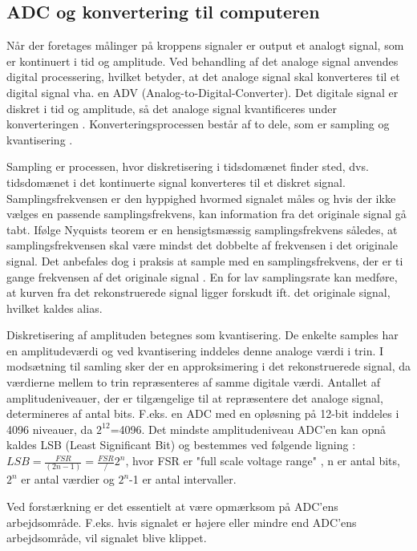 \subsection{ADC og konvertering til computeren}
Når der foretages målinger på kroppens signaler er output et analogt signal, som er kontinuert i tid og amplitude. Ved behandling af det analoge signal anvendes digital processering, hvilket betyder, at det analoge signal skal konverteres til et digital signal vha. en ADV (Analog-to-Digital-Converter). Det digitale signal er diskret i tid og amplitude, så det analoge signal kvantificeres under konverteringen \cite{Webster2009}. Konverteringsprocessen består af to dele, som er sampling og kvantisering \cite{Zouridakis2003}.  

Sampling er processen, hvor diskretisering i tidsdomænet finder sted, dvs. tidsdomænet i det kontinuerte signal konverteres til et diskret signal. Samplingsfrekvensen er den hyppighed hvormed signalet måles og hvis der ikke vælges en passende samplingsfrekvens, kan information fra det originale signal gå tabt. Ifølge Nyquists teorem er en hensigtsmæssig samplingsfrekvens således, at samplingsfrekvensen skal være mindst det dobbelte af frekvensen i det originale signal. \cite{Zouridakis2003} Det anbefales dog i praksis at sample med en samplingsfrekvens, der er ti gange frekvensen af det originale signal . En for lav samplingsrate kan medføre, at kurven fra det rekonstruerede signal ligger forskudt ift. det originale signal, hvilket kaldes alias. \cite{Zouridakis2003}
 
Diskretisering af amplituden betegnes som kvantisering. De enkelte samples har en amplitudeværdi og ved kvantisering inddeles denne analoge værdi i trin. I modsætning til samling sker der en approksimering i det rekonstruerede signal, da værdierne mellem to trin repræsenteres af samme digitale værdi. \cite{Zouridakis2003} Antallet af amplitudeniveauer, der er tilgængelige til at repræsentere det analoge signal, determineres af antal bits. F.eks. en ADC med en opløsning på 12-bit inddeles i 4096 niveauer, da $2^12$=4096. \cite{Konrad2006} Det mindste amplitudeniveau ADC'en kan opnå kaldes LSB (Least Significant Bit) og bestemmes ved følgende ligning : 
$LSB = \frac{FSR}{(2n-1)} = \frac{FSR}/{2^n}$, hvor FSR er "full scale voltage range" , n er antal bits, $2^n$ er antal værdier og $2^n$-1 er antal intervaller. 

Ved forstærkning er det essentielt at være opmærksom på ADC'ens  arbejdsområde. F.eks. hvis signalet er højere eller mindre end ADC'ens arbejdsområde, vil signalet blive klippet.  
 